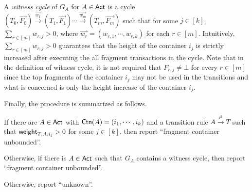 A \emph{witness cycle} of $G_A$ for $A \in {\sf Act}$ is a cycle 
%
$(T_0, \overrightarrow{F_0}) \xrightarrow{\overrightarrow{w_1}} (T_1, \overrightarrow{F_1}) \cdots \xrightarrow{\overrightarrow{w_m}} (T_m, \overrightarrow{F_m})$
%
such that  for some $j \in [k]$, $\sum \limits_{r \in [m]} w_{r, j} > 0$, 
where $\overrightarrow{w_r} = (w_{r, 1}, \cdots, w_{r, k})$ for each $r \in [m]$. Intuitively, $\sum \limits_{r \in [m]} w_{r, j} > 0$ guarantees that the height of the container $i_j$ is strictly increased after executing the all fragment transactions in the cycle. Note that in the definition of witness cycle, it is not required that $F_{r, j} \neq \bot$ for every $r \in [m]$ since the top fragments of the container $i_j$ may not be used in the transitions and what is concerned is only the height increase of the container $i_j$.


Finally, %
the procedure is summarized as follows.
\begin{tcolorbox}[width=1.0\linewidth, title={Algorithm to decide the fragment container unboundedness problem}]
If there are $A \in {\sf Act}$ with ${\sf Ctn}(A) = (i_1, \cdots, i_k)$ and a transition rule $A \xrightarrow{\mu} T$ such that ${\mathsf{weight} }_{T, A, i_j} > 0$ for some $j \in [k]$, then report ``fragment container unbounded''.

Otherwise, if there is $A \in {\sf Act}$ such that $G_A$ contains a witness cycle, then report ``fragment container unbounded''. 

Otherwise, report ``unknown''.
\end{tcolorbox}

